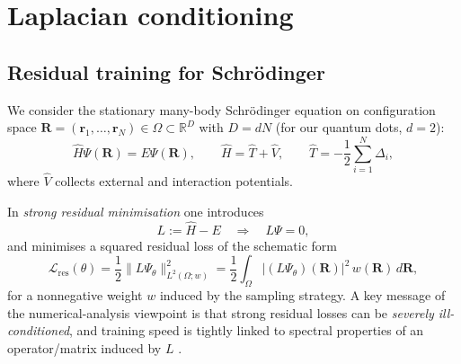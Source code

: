 \chapter{Laplacian conditioning}
\label{app:laplacian}

\section{Residual training for Schr\"odinger}
\label{app:laplacian:setup}

We consider the stationary many-body Schr\"odinger equation on configuration space
$\mathbf R=(\mathbf r_1,\ldots,\mathbf r_N)\in\Omega\subset\mathbb R^{D}$ with $D=dN$
(for our quantum dots, $d=2$):
\begin{equation}
\hat H\Psi(\mathbf R)=E\Psi(\mathbf R),
\qquad
\hat H=\hat T+\hat V,
\qquad
\hat T=-\frac12\sum_{i=1}^N\Delta_i,
\label{eq:lap:sch}
\end{equation}
where $\hat V$ collects external and interaction potentials.

In \emph{strong residual minimisation} one introduces
\begin{equation}
L := \hat H - E \quad\Rightarrow\quad L\Psi = 0,
\end{equation}
and minimises a squared residual loss of the schematic form
\begin{equation}
\mathcal L_{\mathrm{res}}(\theta)
= \frac12\|L\Psi_\theta\|_{L^2(\Omega;w)}^2
= \frac12\int_\Omega |(L\Psi_\theta)(\mathbf R)|^2\,w(\mathbf R)\,d\mathbf R,
\label{eq:lap:resloss}
\end{equation}
for a nonnegative weight $w$ induced by the sampling strategy.
A key message of the numerical-analysis viewpoint is that strong residual losses
can be \emph{severely ill-conditioned}, and training speed is tightly linked to
spectral properties of an operator/matrix induced by $L$ \cite{De_Ryck_2024}.

